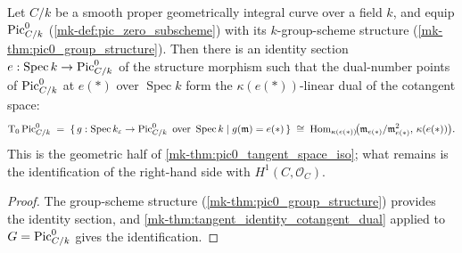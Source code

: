 \begin{theorem}\label{mk-thm:pic0_tangent_cotangent_dual}
  \leanok

  Let \(C/k\) be a smooth proper geometrically integral curve over a
  field \(k\), and equip \(\operatorname{Pic}^0_{C/k}\)
  (\ref{mk-def:pic_zero_subscheme}) with its \(k\)-group-scheme
  structure (\ref{mk-thm:pic0_group_structure}). Then there
  is an identity section \(e : \operatorname{Spec} k \to
  \operatorname{Pic}^0_{C/k}\) of the structure morphism such that the dual-number
  points of \(\operatorname{Pic}^0_{C/k}\) at \(e(*)\) over \(\operatorname{Spec} k\)
  form the \(\kappa(e(*))\)-linear dual of the cotangent space:
  \[
    \textup T_0 \operatorname{Pic}^0_{C/k}
    \;=\;
    \{\, g : \operatorname{Spec} k_\varepsilon \to \operatorname{Pic}^0_{C/k}
        \text{ over } \operatorname{Spec} k
        \mid g(\mathfrak m) = e(*) \,\}
    \;\cong\;
    \operatorname{Hom}_{\kappa(e(*))}\!\bigl(
      \mathfrak m_{e(*)}/\mathfrak m_{e(*)}^2,\, \kappa(e(*))\bigr).
  \]
  This is the geometric half of \ref{mk-thm:pic0_tangent_space_iso};
  what remains is the identification of the right-hand side with
  \(H^1(C, \mathcal O_C)\).
\end{theorem}

\begin{proof}
  \leanok{}
  The group-scheme structure (\ref{mk-thm:pic0_group_structure})
  provides the identity section, and
  \ref{mk-thm:tangent_identity_cotangent_dual} applied to
  \(G = \operatorname{Pic}^0_{C/k}\) gives the identification.
\end{proof}


